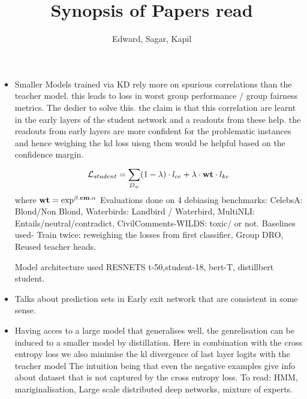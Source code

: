 \documentclass{article}
\begin{document}
\title{Synopsis of Papers read}
\author{Edward, Sagar, Kapil}
\maketitle

\begin{itemize}
    \item
          \cite{tiwari_using_2024}
          Smaller Models trained via KD rely more on spurious correlations than the teacher model. this leads to loss in
          worst group performance / group fairness metrics. The dedier to solve this. the claim is that this correlation
          are learnt in the early layers of the student network and a readouts from these help. the readouts from early layers
          are more confident for the problematic instances and hence weighing the kd loss uisng them would be helpful based on the confidence
          margin.
          \[ \mathcal{L}_{student} =
          \sum_{D_w}^{} (1- \lambda) \cdot l_{ce}  \\
          + \lambda \cdot \textbf{wt} \cdot l_{ke} \] 
          where \(\bf{wt} = \exp^{\beta.\bf{cm}.\alpha} \)  
          Evaluations done on 4 debiasing benchmarks: CelebsA: Blond/Non Blond, Waterbirds: Landbird / Waterbird, MultiNLI: Entails/neutral/contradict,
          CivilComments-WILDS: toxic/ or not. Baselines used- Train twice: reweighing the losses from first classifier, Group DRO, Reused teacher heads.

          Model architecture used RESNETS t-50,student-18, bert-T, distillbert student. 
    \item
          \cite{jazbec_early-exit_2024} Talks about prediction sets in Early exit network that are consistent in some sense.
    \item
          \cite{hinton_distilling_2015} Having acces to a large model that generalises well, the genrelisation can be
          induced to a smaller model by distillation. Here in combination with the cross entropy loss we also minimise the
          kl divergence of last layer logits with the teacher model
          The intuition being that even the negative examples give info about dataset that is not captured by the cross entropy loss.
          To read: HMM, mariginalisation, Large scale distributed deep networks, mixture of experts.
\end{itemize}



 



\end{document}
